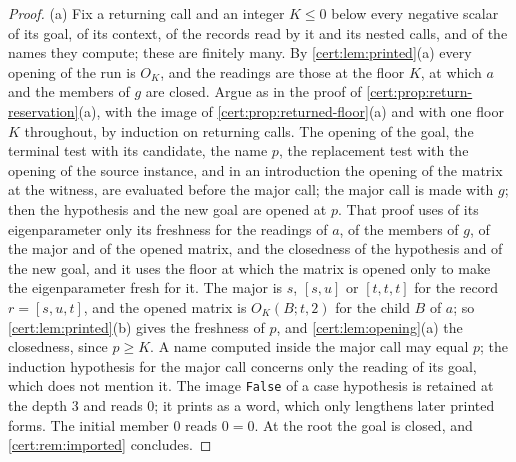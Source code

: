 \begin{proof}
(a) Fix a returning call and an integer $K\le 0$ below every negative scalar of its goal, of its
context, of the records read by it and its nested calls, and of the names they compute; these are
finitely many. By \cref{cert:lem:printed}(a) every opening of the run is $O_K$, and the readings are
those at the floor $K$, at which $a$ and the members of $g$ are closed. Argue as in the proof of
\cref{cert:prop:return-reservation}(a), with the image of \cref{cert:prop:returned-floor}(a) and with
one floor $K$ throughout, by induction on returning calls. The opening of the goal, the terminal test
with its candidate, the name $p$, the replacement test with the opening of the source instance, and
in an introduction the opening of the matrix at the witness, are evaluated before the major call;
the major call is made with $g$; then the hypothesis and the new goal are opened at $p$. That proof
uses of its eigenparameter only its freshness for the readings of $a$, of the members of $g$, of the
major and of the opened matrix, and the closedness of the hypothesis and of the new goal, and it uses
the floor at which the matrix is opened only to make the eigenparameter fresh for it. The major is
$s$, $[s,u]$ or $[t,t,t]$ for the record $r=[s,u,t]$, and the opened matrix is $O_K(B;t,2)$ for the
child $B$ of $a$; so \cref{cert:lem:printed}(b) gives the freshness of $p$, and
\cref{cert:lem:opening}(a) the closedness, since $p\ge K$. A name computed inside the major call may
equal $p$; the induction hypothesis for the major call concerns only the reading of its goal, which
does not mention it. The image \texttt{False} of a case hypothesis is retained at the depth $3$ and
reads $0$; it prints as a word, which only lengthens later printed forms. The initial member $0$ reads
$0=0$. At the root the goal is closed, and \cref{cert:rem:imported} concludes.


\end{proof}
